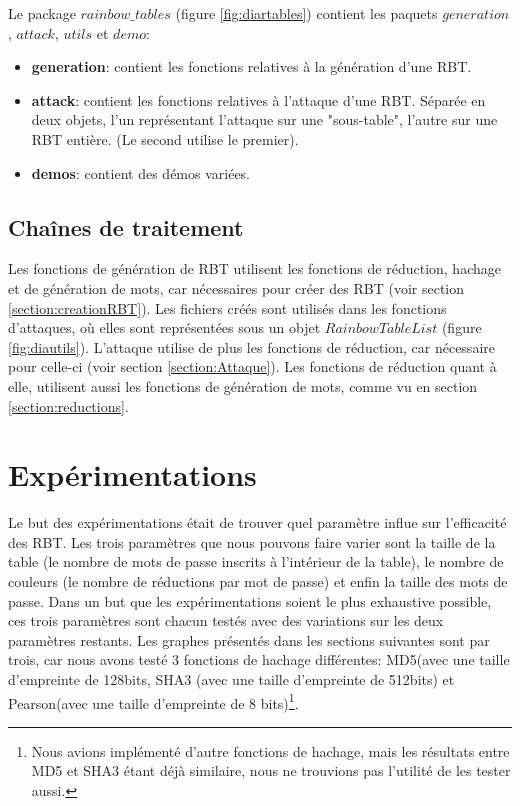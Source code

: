 \documentclass[french,12pt]{article}
\begin{document}
    Le package $rainbow\_tables$ (figure \ref{fig:diartables}) contient les paquets $generation$, $attack$, $utils$ et $demo$:
    \begin{itemize}
        \item \textbf{generation}: contient les fonctions relatives à la génération d'une RBT.
        \item \textbf{attack}: contient les fonctions relatives à l'attaque d'une RBT. Séparée en deux objets, l'un représentant l'attaque sur une "sous-table", l'autre sur une RBT entière. (Le second utilise le premier).
        \item \textbf{demos}: contient des démos variées.
    \end{itemize}
    
    \subsection{Chaînes de traitement}
    Les fonctions de génération de RBT utilisent les fonctions de réduction, hachage et de génération de mots, car nécessaires pour créer des RBT (voir section \ref{section:creationRBT}). Les fichiers créés sont utilisés dans les fonctions d'attaques, où elles sont représentées sous un objet $RainbowTableList$ (figure \ref{fig:diautils}). L'attaque utilise de plus les fonctions de réduction, car nécessaire pour celle-ci (voir section \ref{section:Attaque}).
    \newline \indent Les fonctions de réduction quant à elle, utilisent aussi les fonctions de génération de mots, comme vu en section \ref{section:reductions}.
    

        \newpage
    \section{Expérimentations} \label{section: exp}
    Le but des expérimentations était de trouver quel paramètre influe sur l'efficacité des RBT. Les trois paramètres que nous pouvons faire varier sont la taille de la table (le nombre de mots de passe inscrits à l'intérieur de la table), le nombre de couleurs (le nombre de réductions par mot de passe) et enfin la taille des mots de passe. Dans un but que les expérimentations soient le plus exhaustive possible, ces trois paramètres sont chacun testés avec des variations sur les deux paramètres restants. Les graphes présentés dans les sections suivantes sont par trois, car nous avons testé 3 fonctions de hachage différentes: MD5\cite{WikiMD5}(avec une taille d'empreinte de 128bits, SHA3\cite{WikiSHA3} (avec une taille d'empreinte de 512bits) et Pearson\cite{WikiPearson}(avec une taille d'empreinte de 8 bits)\footnote{Nous avions implémenté d'autre fonctions de hachage, mais les résultats entre MD5 et SHA3 étant déjà similaire, nous ne trouvions pas l'utilité de les tester aussi.}.
\end{document}
